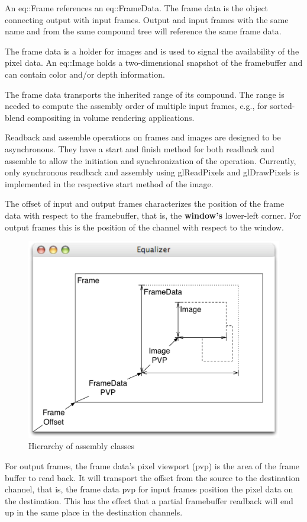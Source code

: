 \documentclass[10pt,a4]{scrartcl}
\begin{document}
An \textsf{eq::Frame} references an \textsf{eq::Fra\-me\-Data}. The
frame data is the object connecting output with input frames. Output and
input frames with the same name and from the same compound tree will
reference the same frame data.

The frame data is a holder for images and is used to signal the
availability of the pixel data. An \textsf{eq::Image} holds a
two-dimensional snapshot of the framebuffer and can contain color and/or
depth information.

The frame data transports the inherited range of its compound. The range
is needed to compute the assembly order of multiple input frames, e.g.,
for sorted-blend compositing in volume rendering applications.

Readback and assemble operations on frames and images are designed to be
asynchronous. They have a start and finish method for both readback and
assemble to allow the initiation and synchronization of the operation.
Currently, only synchronous readback and assembly using
\textsf{glReadPixels} and \textsf{glDrawPixels} is implemented in the
respective start method of the image.

The offset of input and output frames characterizes the position of the
frame data with respect to the framebuffer, that is, the
\textbf{window's} lower-left corner. For output frames this is the
position of the channel with respect to the window.

\begin{figure}
  \includegraphics[width=.6\textwidth]{images/assembly.pdf}
  {\caption{\small\label{fAssembly}Hierarchy of assembly classes}}
\end{figure}
For output frames, the frame data's pixel viewport (pvp) is the area of
the frame buffer to read back. It will transport the offset from the
source to the destination channel, that is, the frame data pvp for input
frames position the pixel data on the destination. This has the effect
that a partial framebuffer readback will end up in the same place in the
destination channels.
\end{document}
